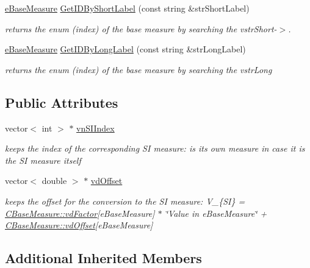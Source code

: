 \begin{DoxyCompactItemize}
\hyperlink{BaseMeasure_8h_ac90e5164ccf1f0d648fba7e94b229a11}{e\+Base\+Measure} \hyperlink{classCBaseMeasure_a8476cf22a5fdcde4df0efc05cde70b45}{Get\+I\+D\+By\+Short\+Label} (const string \&str\+Short\+Label)
\begin{DoxyCompactList}\small\item\em returns the enum (index) of the base measure by searching the vstr\+Short-\/$>$. \end{DoxyCompactList}\item 
\hyperlink{BaseMeasure_8h_ac90e5164ccf1f0d648fba7e94b229a11}{e\+Base\+Measure} \hyperlink{classCBaseMeasure_a5c55d072ffe8e9b5fbe7713039987084}{Get\+I\+D\+By\+Long\+Label} (const string \&str\+Long\+Label)
\begin{DoxyCompactList}\small\item\em returns the enum (index) of the base measure by searching the vstr\+Long \end{DoxyCompactList}\end{DoxyCompactItemize}
\subsection*{Public Attributes}
\begin{DoxyCompactItemize}
\item 
vector$<$ int $>$ $\ast$ \hyperlink{classCBaseMeasure_aaaddf8a6ce321b282885953439472390}{vn\+S\+I\+Index}
\begin{DoxyCompactList}\small\item\em keeps the index of the corresponding SI measure\+: is its own measure in case it is the SI measure itself \end{DoxyCompactList}\item 
vector$<$ double $>$ $\ast$ \hyperlink{classCBaseMeasure_a7220e3dfd4fbdd319a5c3c6af844259e}{vd\+Offset}
\begin{DoxyCompactList}\small\item\em keeps the offset for the conversion to the SI measure\+: V\+\_\+\{SI\} = \hyperlink{classCVectorHandle_af8f8b2e0da8363e695872ca85f33364e}{C\+Base\+Measure\+::vd\+Factor}\mbox{[}e\+Base\+Measure\mbox{]} $\ast$ \char`\"{}\+Value in e\+Base\+Measure\char`\"{} + \hyperlink{classCBaseMeasure_a7220e3dfd4fbdd319a5c3c6af844259e}{C\+Base\+Measure\+::vd\+Offset}\mbox{[}e\+Base\+Measure\mbox{]} \end{DoxyCompactList}\end{DoxyCompactItemize}
\subsection*{Additional Inherited Members}


